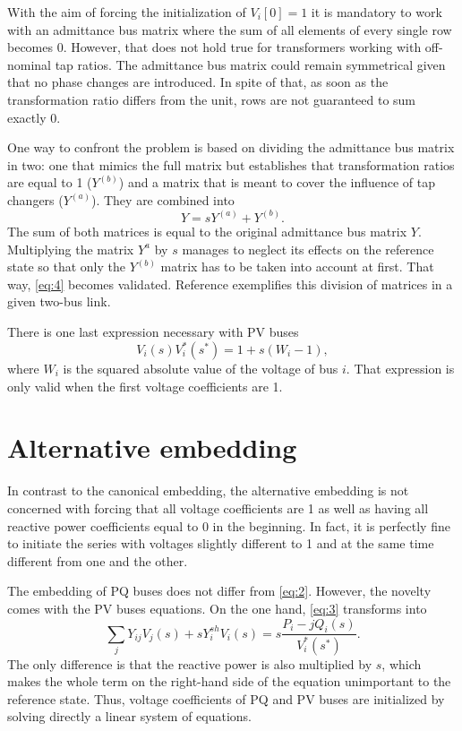\documentclass[conference]{IEEEtran}
\begin{document}
With the aim of forcing the initialization of $V_i[0]=1$ it is mandatory to work with an admittance bus matrix where the sum of all elements of every single row becomes 0. However, that does not hold true for transformers working with off-nominal tap ratios. The admittance bus matrix could remain symmetrical given that no phase changes are introduced. In spite of that, as soon as the transformation ratio differs from the unit, rows are not guaranteed to sum exactly 0.

One way to confront the problem is based on dividing the admittance bus matrix in two: one that mimics the full matrix but establishes that transformation ratios are equal to 1 ($Y^{(b)}$) and a matrix that is meant to cover the influence of tap changers ($Y^{(a)}$). They are combined into
\begin{equation}
  Y=sY^{(a)}+Y^{(b)}.\label{eq:5}
\end{equation}
The sum of both matrices is equal to the original admittance bus matrix $Y$. 
Multiplying the matrix $Y^{a}$ by $s$ manages to neglect its effects on the reference state so that only the $Y^{(b)}$ matrix has to be taken into account at first. That way, \eqref{eq:4} becomes validated. Reference \cite{Tylavsky2} exemplifies this division of matrices in a given two-bus link.

There is one last expression necessary with PV buses
\begin{equation}
  V_i(s)V^*_i(s^*)=1+s(W_i-1),\label{eq:6}
\end{equation}
where $W_i$ is the squared absolute value of the voltage of bus $i$. That expression is only valid when the first voltage coefficients are 1.

\section{Alternative embedding} \label{sec2}
In contrast to the canonical embedding, the alternative embedding is not concerned with forcing that all voltage coefficients are 1 as well as having all reactive power coefficients equal to 0 in the beginning. In fact, it is perfectly fine to initiate the series with voltages slightly different to 1 and at the same time different from one and the other. 

The embedding of PQ buses does not differ from \eqref{eq:2}. However, the novelty comes with the PV buses equations. On the one hand, \eqref{eq:3} transforms into
\begin{equation}
   \sum_{j} Y_{ij}V_j(s) + sY_i^{sh}V_i(s)=s\frac{P_i-jQ_i(s)}{V^*_i(s^*)}.
  \label{eq:7}
\end{equation}
The only difference is that the reactive power is also multiplied by $s$, which makes the whole term on the right-hand side of the equation unimportant to the reference state. Thus, voltage coefficients of PQ and PV buses are initialized by solving directly a linear system of equations.
\end{document}

